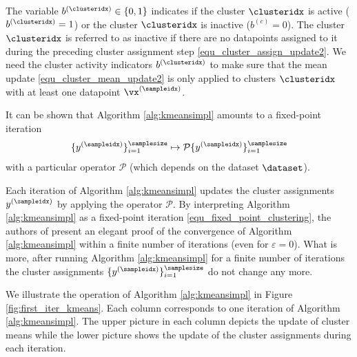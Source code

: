 \documentclass[12pt]{report}
\begin{document}
The variable $b^{(\clusteridx)} \in \{0,1\}$ indicates if the cluster $\clusteridx$ is active ($b^{(\clusteridx)}= 1$) 
or the cluster $\clusteridx$ is inactive ($b^{(c)}=0$). The cluster $\clusteridx$ is referred to as inactive if there 
are no datapoints assigned to it during the preceding cluster assignment step \eqref{equ_cluster_assign_update2}. 
We need the cluster activity indicators $b^{(\clusteridx)}$ to make sure that the mean update \eqref{equ_cluster_mean_update2} 
is only applied to clusters $\clusteridx$ with at least one datapoint $\vx^{(\sampleidx)}$. 

It can be shown that Algorithm \ref{alg:kmeansimpl} amounts to a fixed-point iteration 
\begin{equation}
\label{equ_fixed_point_clustering}
\{ y^{(\sampleidx)} \}_{i=1}^{\samplesize} \mapsto \mathcal{P}  \{ y^{(\sampleidx)} \}_{i=1}^{\samplesize}
\end{equation}
with a particular operator $\mathcal{P}$ (which depends on 
the dataset $\dataset$). 

Each iteration of Algorithm \ref{alg:kmeansimpl} updates the cluster 
assignments $y^{(\sampleidx)}$ by applying the operator $\mathcal{P}$. 
By interpreting Algorithm \ref{alg:kmeansimpl} as a fixed-point iteration 
\eqref{equ_fixed_point_clustering}, the authors of \cite[Thm. 2]{Gray1980} 
present an elegant proof of the convergence of Algorithm \ref{alg:kmeansimpl} 
within a finite number of iterations (even for $\varepsilon = 0$). What is more, 
after running Algorithm \ref{alg:kmeansimpl} for a finite number of iterations 
the cluster assignments $\{ y^{(\sampleidx)} \}_{i=1}^{\samplesize}$ do 
not change any more.   

We illustrate the operation of Algorithm \ref{alg:kmeansimpl} in 
Figure \ref{fig:first_iter_kmeans}. Each column corresponds to 
one iteration of Algorithm \ref{alg:kmeansimpl}. The upper picture 
in each column depicts the update of cluster means while the 
lower picture shows the update of the cluster assignments 
during each iteration. 
\end{document}
